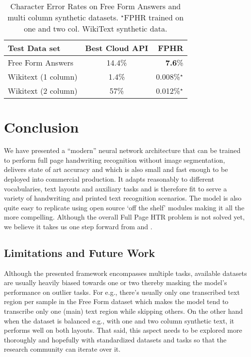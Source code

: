 \documentclass[runningheads]{llncs}
\begin{document}
\begin{table}
\caption{Character Error Rates on Free Form Answers and multi column synthetic datasets. $^\star$FPHR trained on one and two col. WikiText synthetic data.}
\label{tab-free-response}
\vskip 0.15in
\begin{center}
\begin{small}
\begin{tabular}{|l|c|r|}
\toprule
Test Data set & Best Cloud API & FPHR \\
\midrule
Free Form Answers    & 14.4\% & \textbf{7.6}\% \\
Wikitext (1 column)   & 1.4\% & 0.008\%$^\star$ \\
Wikitext (2 column)   & 57\% & 0.012\%$^\star$ \\
\bottomrule
\end{tabular}
\end{small}
\end{center}
\vskip -0.1in
\end{table}

\section{Conclusion}
We have presented a ``modern'' neural network architecture that can be trained to perform full page handwriting recognition without image segmentation, delivers state of art accuracy and which is also small and fast enough to be deployed into commercial production. It adapts reasonably to different vocabularies, text layouts and auxiliary tasks and is therefore fit to serve a variety of handwriting and printed text recognition scenarios. The model is also quite easy to replicate using open source `off the shelf' modules making it all the more compelling. Although the overall Full Page HTR problem is not solved yet, we believe it takes us one step forward from \citep{DBLP:journals/corr/BlucheLM16} and \citep{Bluche2016JointLS}.

\subsection{Limitations and Future Work}
Although the presented framework encompasses multiple tasks, available datasets are usually heavily biased towards one or two thereby masking the model's performance on outlier tasks. For e.g., there's usually only one transcribed text region per sample in the Free Form dataset which makes the model tend to transcribe only one (main) text region while skipping others. On the other hand when the dataset is balanced e.g., with one and two column synthetic text, it performs well on both layouts. That said, this aspect needs to be explored more thoroughly and hopefully with standardized datasets and tasks so that the research community can iterate over it.
\end{document}
